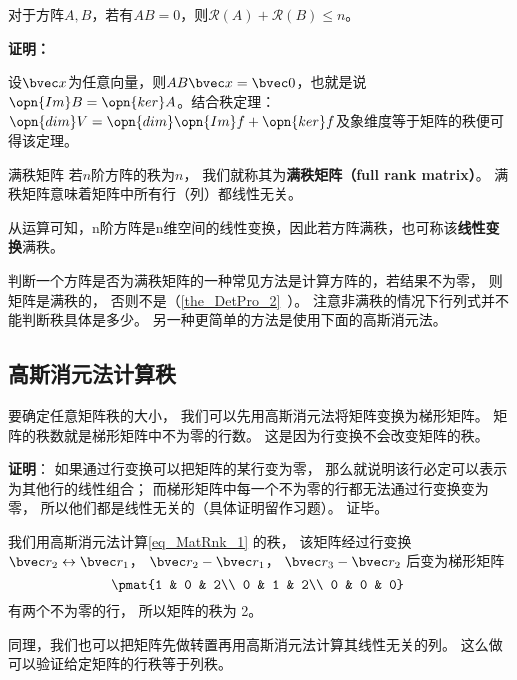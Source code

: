 \begin{theorem}{}
对于方阵$A,B$，若有$AB=0$，则$\mathcal R(A)+\mathcal R(B)\le n$。
\end{theorem}
\textbf{证明：}

设$\bvec x$为任意向量，则$AB\bvec x=\bvec 0$，也就是说$\opn{Im}B=\opn{ker}A$。结合秩定理：$\opn{dim}V=\opn{dim}\opn{Im}f+\opn{ker}f$及象维度等于矩阵的秩便可得该定理。

\begin{definition}{满秩矩阵}
若$n$阶方阵的秩为$n$， 我们就称其为\textbf{满秩矩阵（full rank matrix）}。 满秩矩阵意味着矩阵中所有行（列）都线性无关。
\end{definition}
从运算可知，n阶方阵是n维空间的线性变换，因此若方阵满秩，也可称该\textbf{线性变换}满秩。

判断一个方阵是否为满秩矩阵的一种常见方法是计算方阵的，若结果不为零， 则矩阵是满秩的， 否则不是（\autoref{the_DetPro_2}~）。 注意非满秩的情况下行列式并不能判断秩具体是多少。 另一种更简单的方法是使用下面的高斯消元法。

\subsection{高斯消元法计算秩}
要确定任意矩阵秩的大小， 我们可以先用高斯消元法将矩阵变换为梯形矩阵。 矩阵的秩数就是梯形矩阵中不为零的行数。 这是因为行变换不会改变矩阵的秩。

\textbf{证明}： 如果通过行变换可以把矩阵的某行变为零， 那么就说明该行必定可以表示为其他行的线性组合； 而梯形矩阵中每一个不为零的行都无法通过行变换变为零， 所以他们都是线性无关的（具体证明留作习题）。 证毕。

\begin{example}{}
我们用高斯消元法计算\autoref{eq_MatRnk_1} 的秩， 该矩阵经过行变换 $\bvec r_2 \leftrightarrow \bvec r_1$， $\bvec r_2 - \bvec r_1$， $\bvec r_3 - \bvec r_2$ 后变为梯形矩阵
\begin{equation}
\pmat{1 & 0 & 2\\ 0 & 1 & 2\\ 0 & 0 & 0}~
\end{equation}
有两个不为零的行， 所以矩阵的秩为 2。
\end{example}

同理，我们也可以把矩阵先做转置再用高斯消元法计算其线性无关的列。 这么做可以验证给定矩阵的行秩等于列秩。


